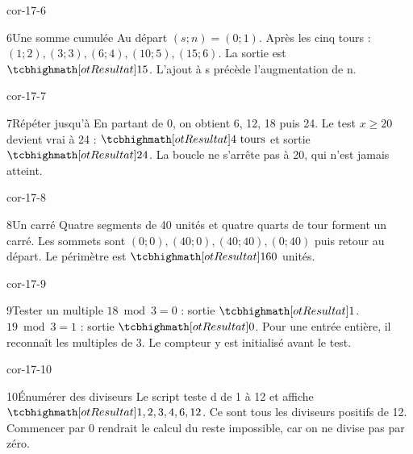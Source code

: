 \begin{blocLivre}{cor-17-6}\begin{corrige}{6}{Une somme cumulée}
Au départ $(s;n)=(0;1)$. Après les cinq tours : $(1;2),(3;3),(6;4),(10;5),(15;6)$. La sortie est $\res{15}$. L’ajout à s précède l’augmentation de n.
\label{fig-cor-17-6}
\end{corrige}\end{blocLivre}
\begin{blocLivre}{cor-17-7}\begin{corrige}{7}{Répéter jusqu’à}
En partant de 0, on obtient 6, 12, 18 puis 24. Le test $x\ge20$ devient vrai à 24 : $\res{4\text{ tours}}$ et sortie $\res{24}$. La boucle ne s’arrête pas à 20, qui n’est jamais atteint.
\label{fig-cor-17-7}
\end{corrige}\end{blocLivre}
\begin{blocLivre}{cor-17-8}\begin{corrige}{8}{Un carré}
Quatre segments de 40 unités et quatre quarts de tour forment un carré. Les sommets sont $(0;0),(40;0),(40;40),(0;40)$ puis retour au départ. Le périmètre est $\res{160}$ unités.
\label{fig-cor-17-8}
\end{corrige}\end{blocLivre}
\begin{blocLivre}{cor-17-9}\begin{corrige}{9}{Tester un multiple}
$18\bmod3=0$ : sortie $\res1$. $19\bmod3=1$ : sortie $\res0$. Pour une entrée entière, il reconnaît les multiples de 3. Le compteur y est initialisé avant le test.
\label{fig-cor-17-9}
\end{corrige}\end{blocLivre}
\begin{blocLivre}{cor-17-10}\begin{corrige}{10}{Énumérer des diviseurs}
Le script teste d de 1 à 12 et affiche $\res{1,2,3,4,6,12}$. Ce sont tous les diviseurs positifs de 12. Commencer par 0 rendrait le calcul du reste impossible, car on ne divise pas par zéro.
\label{fig-cor-17-10}
\end{corrige}\end{blocLivre}
